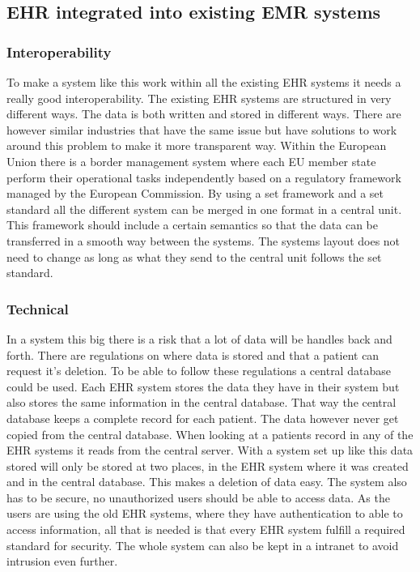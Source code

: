 \documentclass[14pt]{article}
\begin{document}
\subsection{EHR integrated into existing EMR systems}

\subsubsection{Interoperability}
To make a system like this work within all the existing EHR systems it needs a really good 	interoperability. The existing EHR systems are structured in very different ways. The data is both written and stored in different ways.
There are however similar industries that have the same issue but have solutions to work around this problem to make it more transparent way. Within the European Union there is a border management system where each EU member state perform their operational tasks independently based on a regulatory framework managed by the European Commission. By using a set framework and a set standard all the different system can be merged in one format in a central unit. This framework should include a certain semantics so that the data can be transferred in a smooth way between the systems. The systems layout does not need to change as long as what they send to the central unit follows the set standard.

\subsubsection{Technical}
In a system this big there is a risk that a lot of data will be handles back and forth. There are regulations on where data is stored and that a patient can request it's deletion. To be able to follow these regulations a central database could be used. Each EHR system stores the data they have in their system but also stores the same information in the central database. That way the central database keeps a complete record for each patient. The data however never get copied from the central database. When looking at a patients record in any of the EHR systems it reads from the central server. With a system set up like this data stored will only be stored at two places, in the EHR system where it was created and in the central database. This makes a deletion of data easy.
The system also has to be secure, no unauthorized users should be able to access data. As the users are using the old EHR systems, where they have authentication to able to access information, all that is needed is that every EHR system fulfill a required standard for security. The whole system can also be kept in a intranet to avoid intrusion even further.
\end{document}

